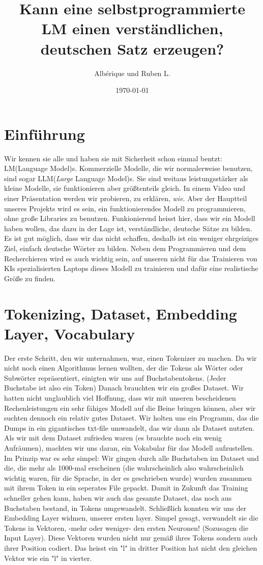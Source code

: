 \documentclass[12pt, letterpaper]{article}
\title{Kann eine selbstprogrammierte LM einen verständlichen, deutschen Satz erzeugen?}
\author{Albérique und Ruben L.}
\date{\today}
\begin{document}
\maketitle
\newpage
\section{Einführung}

Wir kennen sie alle und haben sie mit Sicherheit schon einmal bentzt: LM(Language Model)s. Kommerzielle Modelle, die wir normalerweise benutzen, sind sogar LLM(\textit{Large} Language Model)s. Sie sind weitaus leistungsstärker als kleine Modelle, sie funktionieren aber größtenteils gleich. In einem Video und einer Präsentation werden wir probieren, zu erklären, \textit{wie}. Aber der Hauptteil unseres Projekts wird es sein, ein funktionierendes Modell zu programmieren, ohne große Libraries zu benutzen. Funkionierend heisst hier, dass wir ein Modell haben wollen, das dazu in der Lage ist, verständliche, deutsche Sätze zu bilden. Es ist gut möglich, dass wir das nicht schaffen, deshalb ist ein weniger ehrgeiziges Ziel, einfach deutsche Wörter zu bilden. Neben dem Programmieren und dem Recherchieren wird es auch wichtig sein, auf unseren nicht für das Trainieren von KIs spezialisierten Laptops dieses Modell zu trainieren und dafür eine realistische Größe zu finden.
\section{Tokenizing, Dataset, Embedding Layer, Vocabulary}
Der erste Schritt, den wir unternahmen, war, einen Tokenizer zu machen. Da wir nicht noch einen Algorithmus lernen wollten, der die Tokens als Wörter oder Subwörter repräsentiert, einigten wir uns auf Buchstabentokens. (Jeder Buchstabe ist also ein Token)
Danach brauchten wir ein großes Dataset. Wir hatten nicht unglaublich viel Hoffnung, dass wir mit unseren bescheidenen Rechenleistungen ein sehr fähiges Modell auf die Beine bringen können, aber wir suchten dennoch ein relativ gutes Dataset. Wir holten uns ein Programm, das die Dumps in ein gigantisches txt-file umwandelt, das wir dann als Dataset nutzten.
Als wir mit dem Dataset zufrieden waren (es brauchte noch ein wenig Aufräumen), machten wir uns daran, ein Vokabular für das Modell aufzustellen. Im Prinzip war es sehr simpel: Wir gingen durch alle Buchstaben im Dataset und die, die mehr als 1000-mal erscheinen (die wahrscheinlich also wahrscheinlich wichtig waren, für die Sprache, in der es geschrieben wurde) wurden zusammen mit ihrem Token in ein seperates File gepackt.
Damit in Zukunft das Training schneller gehen kann, haben wir auch das gesamte Dataset, das noch aus Buchstaben bestand, in Tokens umgewandelt. 
Schließlich konnten wir uns der Embedding Layer widmen, unserer ersten layer. Simpel gesagt, verwandelt sie die Tokens in Vektoren, -mehr oder weniger- den ersten Neuronen! (Sozusagen die Input Layer). Diese Vektoren wurden nicht nur gemäß ihres Tokens sondern auch ihrer Position codiert. Das heisst ein "l" in dritter Position hat nicht den gleichen Vektor wie ein "l" in vierter. 
\end{document}
